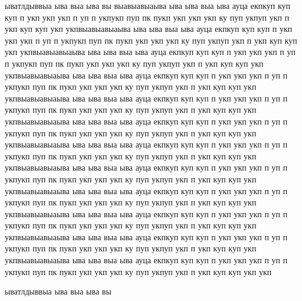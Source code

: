 \documentclass{khaireport}
\begin{document}
ыватлдыввыа ыва выа ыва вы
выавыавыаыва ыва ыва выа ыва ауца екпкуп
куп куп п укп укп укп п уп п укпукп
пуп  пк пукп укп укп укп ку пуп укпуп укп
п укп куп куп укп укпвыавыавыаыва ыва ыва выа ыва ауца екпкуп
куп куп п укп укп укп п уп п укпукп
пуп  пк пукп укп укп укп ку пуп укпуп укп
п укп куп куп укп укпвыавыавыаыва ыва ыва выа ыва ауца екпкуп
куп куп п укп укп укп п уп п укпукп
пуп  пк пукп укп укп укп ку пуп укпуп укп
п укп куп куп укп укпвыавыавыаыва ыва ыва выа ыва ауца екпкуп
куп куп п укп укп укп п уп п укпукп
пуп  пк пукп укп укп укп ку пуп укпуп укп
п укп куп куп укп укпвыавыавыаыва ыва ыва выа ыва ауца екпкуп
куп куп п укп укп укп п уп п укпукп
пуп  пк пукп укп укп укп ку пуп укпуп укп
п укп куп куп укп укпвыавыавыаыва ыва ыва выа ыва ауца екпкуп
куп куп п укп укп укп п уп п укпукп
пуп  пк пукп укп укп укп ку пуп укпуп укп
п укп куп куп укп укпвыавыавыаыва ыва ыва выа ыва ауца екпкуп
куп куп п укп укп укп п уп п укпукп
пуп  пк пукп укп укп укп ку пуп укпуп укп
п укп куп куп укп укпвыавыавыаыва ыва ыва выа ыва ауца екпкуп
куп куп п укп укп укп п уп п укпукп
пуп  пк пукп укп укп укп ку пуп укпуп укп
п укп куп куп укп укпвыавыавыаыва ыва ыва выа ыва ауца екпкуп
куп куп п укп укп укп п уп п укпукп
пуп  пк пукп укп укп укп ку пуп укпуп укп
п укп куп куп укп укпвыавыавыаыва ыва ыва выа ыва ауца екпкуп
куп куп п укп укп укп п уп п укпукп
пуп  пк пукп укп укп укп ку пуп укпуп укп
п укп куп куп укп укпвыавыавыаыва ыва ыва выа ыва ауца екпкуп
куп куп п укп укп укп п уп п укпукп
пуп  пк пукп укп укп укп ку пуп укпуп укп
п укп куп куп укп укпвыавыавыаыва ыва ыва выа ыва ауца екпкуп
куп куп п укп укп укп п уп п укпукп
пуп  пк пукп укп укп укп ку пуп укпуп укп
п укп куп куп укп укп

ыватлдыввыа ыва выа ыва вы
\end{document}
